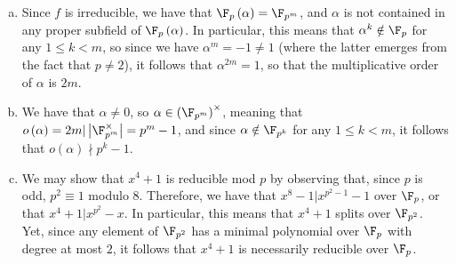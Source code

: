 \documentclass[10pt]{mypackage}
\begin{document}
\begin{solution}\hfill
  \begin{enumerate}[(a)]
    \item Since $f$ is irreducible, we have that $\F_p\left( \alpha \right) = \F_{p^{m}}$, and $\alpha$ is not contained in any proper subfield of $\F_p\left( \alpha \right)$. In particular, this means that $\alpha^{k}\notin \F_p$ for any $1\leq k < m$, so since we have $\alpha^{m} = -1\neq 1$ (where the latter emerges from the fact that $p\neq 2$), it follows that $\alpha^{2m} = 1$, so that the multiplicative order of $\alpha$ is $2m$.
    \item We have that $\alpha\neq 0$, so $\alpha\in \left( \F_{p^{m}} \right)^{\times}$, meaning that $o\left( \alpha \right) = 2m | \left\vert \F_{p^{m}}^{\times} \right\vert = p^{m}-1$, and since $\alpha\notin \F_{p^{k}}$ for any $1\leq k < m$, it follows that $o\left( \alpha \right)\nmid p^{k}-1$.
    \item We may show that $x^{4} + 1$ is reducible mod $p$ by observing that, since $p$ is odd, $p^2 \equiv 1$ modulo $8$. Therefore, we have that $x^{8}-1 | x^{p^2-1}-1$ over $\F_p$, or that $x^{4} + 1 | x^{p^2}-x$. In particular, this means that $x^4 + 1$ splits over $\F_{p^2}$. Yet, since any element of $\F_{p^2}$ has a minimal polynomial over $\F_p$ with degree at most $2$, it follows that $x^{4} + 1$ is necessarily reducible over $\F_p$.
  \end{enumerate}
\end{solution}
\end{document}
